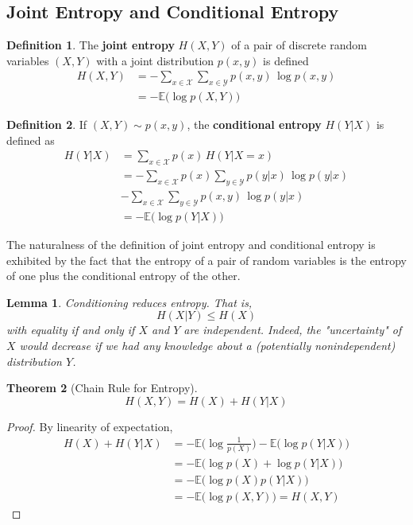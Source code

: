 \documentclass[a4paper, 12pt]{report}
\newtheorem{theorem}{Theorem}[section]
\newtheorem{lemma}[theorem]{Lemma}
\theoremstyle{remark}
\theoremstyle{definition}
\newtheorem{definition}{Definition}[section]
\begin{document}
\subsection{Joint Entropy and Conditional Entropy}
\begin{definition}
The \textbf{joint entropy} $H(X, Y)$ of a pair of discrete random variables $(X, Y)$ with a joint distribution $p(x, y)$ is defined
\begin{align*}
    H(X, Y) & = - \sum_{x \in \mathcal{X}} \sum_{x \in \mathcal{Y}} p(x, y)\, \log p(x, y) \\
    & = - \mathbb{E}\big(\log p(X, Y)\big)
\end{align*}
\end{definition}

\begin{definition}
If $(X, Y) \sim p(x, y)$, the \textbf{conditional entropy} $H(Y|X)$ is defined as
\begin{align*}
    H(Y|X) & = \sum_{x \in \mathcal{X}} p(x) \, H(Y|X = x) \\
    & = - \sum_{x \in \mathcal{X}} p(x) \sum_{y \in \mathcal{Y}} p(y|x)\, \log p(y|x) \\
    & - \sum_{x \in \mathcal{X}} \sum_{y \in \mathcal{Y}} p(x, y) \, \log p(y|x) \\
    & = - \mathbb{E} \big( \log p(Y|X)\big)
\end{align*}
\end{definition}

The naturalness of the definition of joint entropy and conditional entropy is exhibited by the fact that the entropy of a pair of random variables is the entropy of one plus the conditional entropy of the other. 

\begin{lemma}
Conditioning reduces entropy. That is,
\[H(X|Y) \leq H(X)\]
with equality if and only if $X$ and $Y$ are independent. Indeed, the "uncertainty" of $X$ would decrease if we had any knowledge about a (potentially nonindependent) distribution $Y$. 
\end{lemma}

\begin{theorem}[Chain Rule for Entropy]
\[H(X, Y) = H(X) + H(Y|X)\]
\end{theorem}
\begin{proof}
By linearity of expectation, 
\begin{align*}
    H(X) + H(Y|X) & = - \mathbb{E} \Big( \log \frac{1}{p(X)}\Big) - \mathbb{E} \big( \log p(Y|X)\big) \\
    & = - \mathbb{E} \big( \log p(X) + \log p (Y|X) \big) \\
    & = - \mathbb{E} \big( \log p(X) p(Y|X)\big) \\
    & = - \mathbb{E} \big( \log p(X, Y) \big) = H(X, Y)
\end{align*}
\end{proof}
\end{document}
